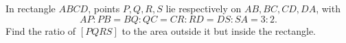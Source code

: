 In rectangle $ABCD$, points $P,Q,R,S$ lie respectively on $AB,BC,CD,DA$, with
\[AP:PB=BQ:QC=CR:RD=DS:SA=3:2.\]
Find the ratio of $[PQRS]$ to the area outside it but inside the rectangle.
